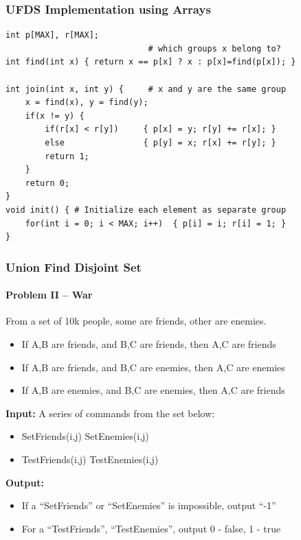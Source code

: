 \begin{frame}[fragile]
  \frametitle{UFDS Implementation using Arrays}

  {\small
\begin{verbatim}
int p[MAX], r[MAX];
                             # which groups x belong to?
int find(int x) { return x == p[x] ? x : p[x]=find(p[x]); }

int join(int x, int y) {     # x and y are the same group
    x = find(x), y = find(y);
    if(x != y) {
        if(r[x] < r[y])     { p[x] = y; r[y] += r[x]; }
        else                { p[y] = x; r[x] += r[y]; }
        return 1;
    }
    return 0;
}
void init() { # Initialize each element as separate group
    for(int i = 0; i < MAX; i++)  { p[i] = i; r[i] = 1; }
}
\end{verbatim}
}

\end{frame}

\begin{frame}
  \frametitle{Union Find Disjoint Set}
  \framesubtitle{Problem II -- War}
  {\small
  \begin{block}{}
    From a set of 10k people, some are friends, other are enemies.
    \begin{itemize}
      \item If A,B are friends, and B,C are friends, then A,C are friends
      \item If A,B are friends, and B,C are enemies, then A,C are enemies
      \item If A,B are enemies, and B,C are enemies, then A,C are friends
    \end{itemize}

    {\bf Input:} A series of commands from the set below:
    \begin{itemize}
    \item SetFriends(i,j) \hspace{1.1cm} SetEnemies(i,j)
    \item TestFriends(i,j) \hspace{1cm} TestEnemies(i,j)
    \end{itemize}

    {\bf Output:}
    \begin{itemize}
    \item If a ``SetFriends'' or ``SetEnemies'' is impossible, output ``-1''
    \item For a ``TestFriends'', ``TestEnemies'', output 0 - false, 1 - true
    \end{itemize}
  \end{block}}

\end{frame}

